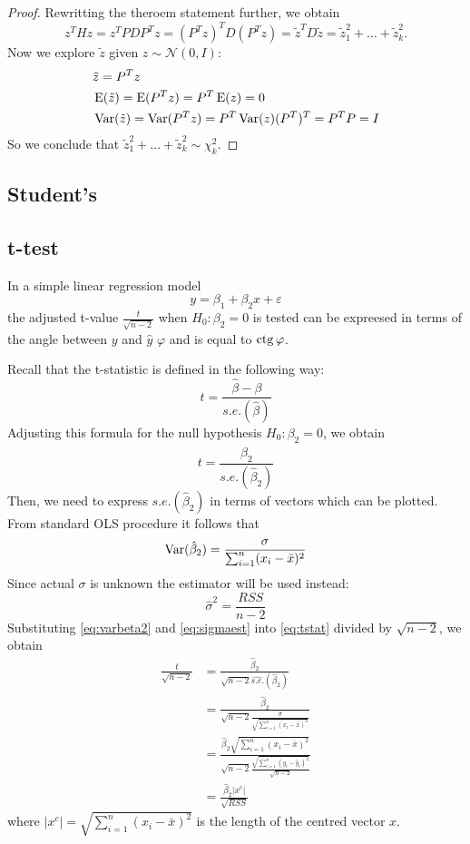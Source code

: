 \begin{proof}
Rewritting the theroem statement further, we obtain
\[
z^T H z = z^T P D P^T z = (P^T z)^T D (P^T z) = \tilde z^T D \tilde z = \tilde z_1^2 + \ldots + \tilde z_k^2.
\]
Now we explore $\tilde z$ given $z \sim \mathcal{N}(0, I)$:
\begin{align*}
&\tilde z = P^T z \\
&\operatorname{E}(\tilde z) = \operatorname{E}(P^T z) = P^T \operatorname{E}(z) = 0 \\
&\operatorname{Var}(\tilde z) = \operatorname{Var}(P^T z) = P^T \operatorname{Var}(z) (P^T)^T = P^T P = I
\end{align*}
So we conclude that $\tilde z_1^2 + \ldots + \tilde z_k^2 \sim \chi^2_k$.




\end{proof}




\subsection{Student's}

\subsection{t-test}

In a simple linear regression model
\[
y = \beta_1 + \beta_2 x + \varepsilon
\]
the adjusted t-value $\frac{t}{\sqrt{n-2}}$ when $H_0: \beta_2 = 0$ is tested
can be expreesed in terms of the angle between $y$ and $\hat y$ $\varphi$ and
is equal to $\operatorname{ctg} \varphi$.

Recall that the t-statistic is defined in the following way:
\[
t = \frac{\hat \beta - \beta}{s.e.(\hat\beta)}
\]
Adjusting this formula for the null hypothesis $H_0: \beta_2 = 0$, we obtain
\begin{equation}\label{eq:tstat}
t = \frac{\hat \beta_2}{s.e.(\hat\beta_2)}
\end{equation}
Then, we need to express $s.e.(\hat\beta_2)$ in terms of vectors which can be
plotted. From standard OLS procedure it follows that
\begin{equation}\label{eq:varbeta2}
\operatorname{Var}(\hat \beta_2) = \frac{\sigma}{\sum_{i=1}^n (x_i - \bar x)^2}
\end{equation}
Since actual $\sigma$ is unknown the estimator will be used instead:
\begin{equation}\label{eq:sigmaest}
\hat \sigma^2 = \frac{RSS}{n-2}
\end{equation}
Substituting \eqref{eq:varbeta2} and \eqref{eq:sigmaest} into \eqref{eq:tstat}
divided by $\sqrt{n-2}$, we obtain
\begin{align*}
\frac{t}{\sqrt{n-2}} &= \frac{\hat \beta_2}{\sqrt{n-2}\widehat{s.e.}(\hat\beta_2)} \\
&= \frac{\hat \beta_2}{\sqrt{n-2}\frac{\hat \sigma}{\sqrt{\sum_{i=1}^n (x_i - \bar x)^2}}} \\
&= \frac{\hat \beta_2 \sqrt{\sum_{i=1}^n (x_i - \bar x)^2}}{\sqrt{n-2}\frac{\sqrt{\sum_{i=1}^n (y_i - \hat y_i)^2}}{\sqrt{n-2}}} \\
&= \frac{\hat \beta_2 \vert x^c \vert}{\sqrt{RSS}}
\end{align*}
where $ \vert x^c \vert = \sqrt{\sum_{i=1}^n (x_i - \bar x)^2}$ is the length of the
centred vector $x$.

